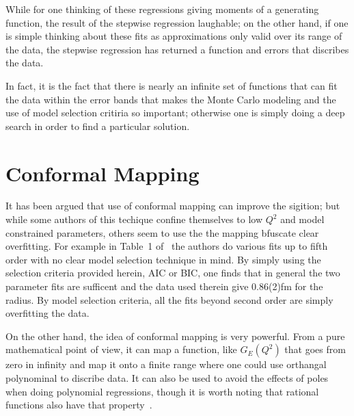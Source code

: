\documentclass[10pt,aps,prc,twocolumn]{revtex4-1}
\begin{document}
\begin{appendix}
While for one thinking of these regressions giving moments of a generating function, the result
of the stepwise regression laughable; on the other hand, if one is simple thinking about these fits 
as approximations only valid over its range of the data, the stepwise
regression has returned a function and errors that discribes the data.

In fact, it is the fact that there is nearly an infinite set of functions that can fit the data within the 
error bands that makes the Monte Carlo modeling and the use of model selection critiria so important; otherwise
one is simply doing a deep search in order to find a particular solution. 

\section{Conformal Mapping}

It has been argued that use of conformal mapping can improve the sigition; but while some authors of this
techique confine themselves to low $Q^2$ and model constrained parameters, others seem to use the
the mapping bfuscate clear overfitting.    
For example in Table~1 of~\cite{Hill:2010yb}
the authors do various fits up to fifth order with no clear model selection technique in mind.
By simply using the selection criteria provided herein, AIC or BIC, one finds that
in general the two parameter fits are sufficent and the data used therein 
give 0.86(2)fm for the radius.   By model selection criteria, all the fits beyond second 
order are simply overfitting the data.   

On the other hand, the idea of conformal mapping is very powerful.   From a pure mathematical point
of view, it can map a function, like $G_E(Q^2)$ that goes from zero in infinity and map it onto a
finite range where one could use orthangal polynominal to discribe data.   It can also be used to
avoid the effects of poles when doing polynomial regressions, though it is worth noting
that rational functions also have that property~\cite{NR}.


\end{appendix}
\end{document}

